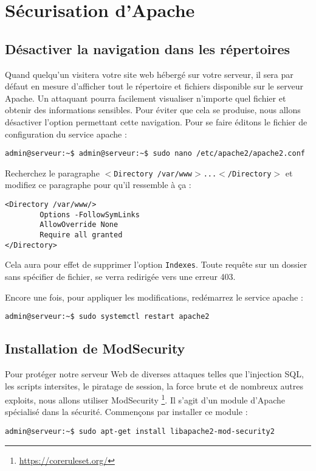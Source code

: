 \section{Sécurisation d'Apache}


\subsection{Désactiver la navigation dans les répertoires}
Quand quelqu'un visitera votre site web hébergé sur votre serveur, il sera par défaut en mesure d'afficher tout le répertoire et fichiers disponible sur le serveur Apache. Un attaquant pourra facilement visualiser n'importe quel fichier et obtenir des informations sensibles. Pour éviter que cela se produise, nous allons désactiver l'option permettant cette navigation. Pour se faire éditons le fichier de configuration du service apache : 
\begin{verbatim}
admin@serveur:~$ admin@serveur:~$ sudo nano /etc/apache2/apache2.conf
\end{verbatim}
Recherchez le paragraphe \texttt{$<$Directory /var/www$>$...$<$/Directory$>$} et modifiez ce paragraphe pour qu'il ressemble à ça : 
\begin{verbatim}
<Directory /var/www/>
        Options -FollowSymLinks
        AllowOverride None
        Require all granted
</Directory>
\end{verbatim}

Cela aura pour effet de supprimer l'option \texttt{Indexes}. Toute requête sur un dossier sans spécifier de fichier, se verra redirigée vers une erreur 403.

Encore une fois, pour appliquer les modifications, redémarrez le service apache :
\begin{verbatim}
admin@serveur:~$ sudo systemctl restart apache2
\end{verbatim}

\subsection{Installation de ModSecurity}
 Pour protéger notre serveur Web de diverses attaques telles que l’injection SQL, les scripts intersites, le piratage de session, la force brute et de nombreux autres exploits, nous allons utiliser ModSecurity \footnote{\url{https://coreruleset.org/}}. Il s'agit d'un module d'Apache spécialisé dans la sécurité. Commençons par installer ce module : 
 \begin{verbatim}
admin@serveur:~$ sudo apt-get install libapache2-mod-security2
\end{verbatim}


